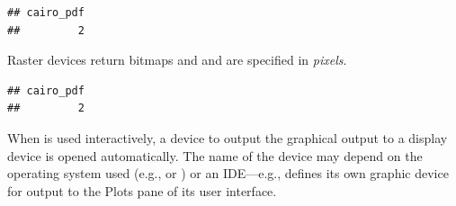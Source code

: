 \documentclass[krantz2]{krantz}\usepackage{knitr}
\begin{document}
\begin{knitrout}\footnotesize
{}\color{fgcolor}\begin{kframe}
\begin{alltt}
\hlstd{(} \hlstd{=} \hlstd{,}  \hlstd{=} \hlstd{,}  \hlstd{=} \hlstd{,}  \hlstd{=} \hlstd{)}
 \hlopt{~}   
 \hlopt{~}   
\hlstd{()}
\end{alltt}
\begin{verbatim}
## cairo_pdf 
##         2
\end{verbatim}
\end{kframe}
\end{knitrout}

Raster devices return bitmaps and  and  are specified in \emph{pixels}.

\begin{knitrout}\footnotesize
{}\color{fgcolor}\begin{kframe}
\begin{alltt}
\hlstd{(} \hlstd{=} \hlstd{,}  \hlstd{=} \hlstd{,}  \hlstd{=} \hlstd{)}
 \hlopt{~}   
\hlstd{()}
\end{alltt}
\begin{verbatim}
## cairo_pdf 
##         2
\end{verbatim}
\end{kframe}
\end{knitrout}

When \Rlang is used interactively, a device to output the graphical output to a display device is opened automatically. The name of the device may depend on the operating system used (e.g.,   or ) or an IDE---e.g.,  \RStudio defines its own graphic device for output to the Plots pane of its user interface.
\end{document}
